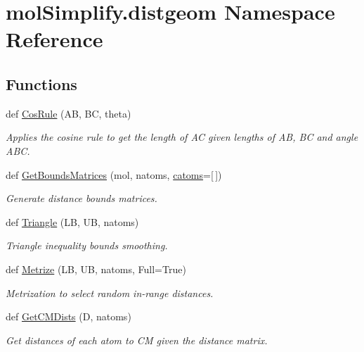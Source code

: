 \hypertarget{namespacemolSimplify_1_1distgeom}{}\section{mol\+Simplify.\+distgeom Namespace Reference}
\label{namespacemolSimplify_1_1distgeom}
\subsection*{Functions}
\begin{DoxyCompactItemize}
\item 
def \hyperlink{namespacemolSimplify_1_1distgeom_a4acf9d8d49cd4e59048bfd34a8ca694f}{Cos\+Rule} (AB, BC, theta)
\begin{DoxyCompactList}\small\item\em Applies the cosine rule to get the length of AC given lengths of AB, BC and angle A\+BC. \end{DoxyCompactList}\item 
def \hyperlink{namespacemolSimplify_1_1distgeom_a4bc2fea7054e74224acf7455ef2457c2}{Get\+Bounds\+Matrices} (mol, natoms, \hyperlink{namespacemolSimplify_1_1distgeom_a3aab6d25e8f34a4b314e6ae3e33b5655}{catoms}=\mbox{[}$\,$\mbox{]})
\begin{DoxyCompactList}\small\item\em Generate distance bounds matrices. \end{DoxyCompactList}\item 
def \hyperlink{namespacemolSimplify_1_1distgeom_ae87d97e79600fafa6255331c1b738af6}{Triangle} (LB, UB, natoms)
\begin{DoxyCompactList}\small\item\em Triangle inequality bounds smoothing. \end{DoxyCompactList}\item 
def \hyperlink{namespacemolSimplify_1_1distgeom_aeea656ddbab4cd45d9229cf937cc5166}{Metrize} (LB, UB, natoms, Full=True)
\begin{DoxyCompactList}\small\item\em Metrization to select random in-\/range distances. \end{DoxyCompactList}\item 
def \hyperlink{namespacemolSimplify_1_1distgeom_a0e20f4ca4b2932cc006bc638df4fe07b}{Get\+C\+M\+Dists} (D, natoms)
\begin{DoxyCompactList}\small\item\em Get distances of each atom to CM given the distance matrix. \end{DoxyCompactList}\item 

\end{DoxyCompactItemize}
